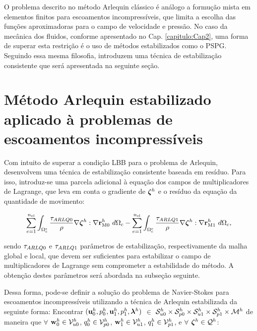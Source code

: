 \documentclass[tese_patricia]{subfiles}
\begin{document}
O problema descrito no método Arlequin clássico é análogo a formução mista em elementos finitos para escoamentos incompressíveis, que limita a escolha das funções aproximadoras para o campo de velocidade e pressão. No caso da mecânica dos fluidos, conforme apresentado no Cap. \ref{capitulo:Cap2}, uma forma de superar esta restrição é o uso de métodos estabilizados como o PSPG. Seguindo essa mesma filosofia,   introduzem uma técnica de estabilização consistente que será apresentada na seguinte seção. 

\section{Método Arlequin estabilizado aplicado à problemas de escoamentos incompressíveis}


Com intuito de superar a condição LBB para o problema de Arlequin,  desenvolvem uma técnica de estabilização consistente baseada em resíduo. Para isso, introduz-se uma parcela adicional à equação dos campos de multiplicadores de Lagrange, que leva em conta o gradiente de $\boldsymbol{\zeta}^h$ e o resíduo da equação da quantidade de movimento:

\begin{align}
	\sum_{e=1}^{n_{\mathrm{el}}} \int_{\Omega^e_{c}} \frac{\tau_{ARLQ0}}{\rho} \nabla \boldsymbol{\zeta}^h : \nabla \mathbf{r}_{\mathrm{M0}}^{h} \ d\Omega_{c} - 
	\sum_{e=1}^{n_{\mathrm{el}}} \int_{\Omega^e_{c}} \frac{\tau_{ARLQ1}}{\rho} \nabla \boldsymbol{\zeta}^h : \nabla \mathbf{r}_{\mathrm{M1}}^{h} \ d\Omega_{c},
\end{align}

\noindent sendo $\tau_{ARLQ0}$ e $\tau_{ARLQ1}$ parâmetros de estabilização, respectivamente da malha global e local, que devem ser suficientes para estabilizar o campo de multiplicadores de Lagrange sem comprometer a estabilidade do método. A obtenção destes parâmetros será abordada na subseção seguinte. 

Dessa forma, pode-se definir a solução do problema de Navier-Stokes para escoamentos incompressíveis utilizando a técnica de Arlequin estabilizada da seguinte forma: Encontrar $(\mathbf{u}_0^h,p_0^h,\mathbf{u}_1^h,p_1^h,\boldsymbol{\lambda}^h)$ $\in$ $\mathcal{S}_{u0}^h \times \mathcal{S}_{p0}^h \times \mathcal{S}_{u1}^h \times \mathcal{S}_{p1}^h \times \mathcal{M}^h$ de maneira que  $\forall$ $\mathbf{w}_0^h \in \mathcal{V}_{u0}^h$, $q_0^h \in \mathcal{V}_{p0}^h$, $\mathbf{w}_1^h \in \mathcal{V}_{u1}^h$, $q_1^h \in \mathcal{V}_{p1}^h$,   e $\forall$ $\boldsymbol{\zeta}^h \in \mathcal{Q}^h$:
\end{document}
